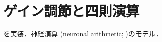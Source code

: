 \section{ゲイン調節と四則演算}

\cite{Goldwyn2018-ug}を実装．神経演算 (neuronal arithmetic; \cite{Angus_Silver2010-fd})のモデル．

